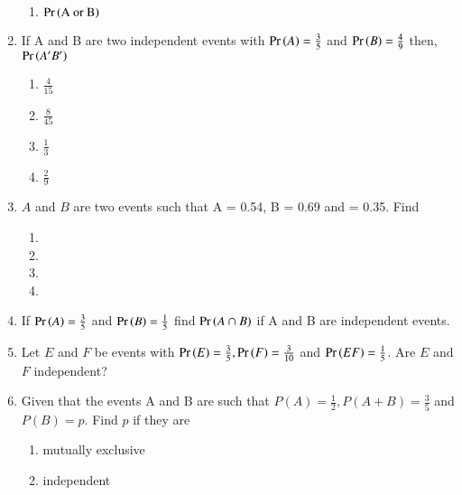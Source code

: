 \begin{enumerate}[label=\thesubsection.\arabic*,ref=\thesubsection.\theenumi]
\begin{enumerate}
\item $\Pr\left(\text{A or B}\right)$ 
\end{enumerate}
\solution

\item If A and B are two independent events with $\Pr\left(A\right)=\frac{3}{5}$ and $\Pr\left(B\right)=\frac{4}{9}$ then, $\Pr\left(A^\prime B^\prime\right)$
\begin{enumerate}
		 \setlength{\itemsep}{1ex} %
\item $\frac{4}{15}$ 
\item $\frac{8}{45}$
\item $\frac{1}{3}$
\item $\frac{2}{9}$
\end{enumerate}
		\solution
		 
%
\item $A$ and $B$ are two events such that \pr A = 0.54, \pr B = 0.69 and  = 0.35.
%
Find \begin{enumerate}
\item {}
\item {}
\item {}
\item {} 
\end{enumerate} 
		\solution

\item If $\Pr\left(A\right) = \frac{3}{5}$ and $\Pr\left(B\right) = \frac{1}{5}$ find $\Pr\left(A \cap B\right)$ if A and B are independent events.
	\\
\solution

%
\item   Let $E$ and $F$ be events with $\Pr\left(E\right)=\frac{3}{5}, \Pr\left(F\right)=\frac{3}{10}$ and $\Pr\left(E F\right)=\frac{1}{5}$. Are $E$ and $F$ independent?
	\\
\solution

\item Given that the events A and B are such that $P(A)=\frac{1}{2}, P(A + B)=\frac{3}{5}$ and $P(B)=p$. Find $p$ if they are 
\begin{enumerate}
\item mutually exclusive
\item independent
\end{enumerate}
\solution



\end{enumerate}
